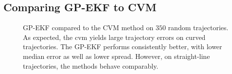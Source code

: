 \subsection{Comparing GP-EKF to CVM}
\begin{figure}[h]
    \centering
    \caption{GP-EKF compared to the CVM method on $350$ random trajectories. As expected, the \acrshort{cvm} yields large trajectory errors on curved trajectories. The GP-EKF performs consistently better, with lower median error as well as lower spread. However, on straight-line trajectories, the methods behave comparably.}
    \label{fig:stats_curved_gp_ekf_cvm}
\end{figure}
